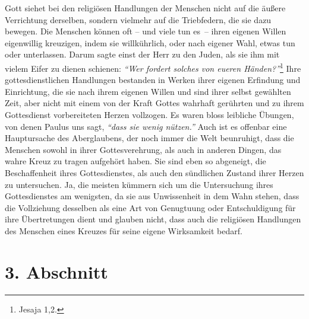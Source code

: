  Gott siehet bei den religiösen
Handlungen der Menschen nicht auf die äußere
Verrichtung derselben, sondern vielmehr auf die Triebfedern, die sie dazu
bewegen.  Die Menschen können oft -- und viele
tun es~-- ihren eigenen Willen
eigenwillig kreuzigen, indem sie willkührlich, oder nach eigener Wahl, etwas
tun oder
unterlassen. Darum sagte einst der Herr zu den Juden, als
sie ihm
mit vielem
Eifer zu dienen schienen:
\textit{"`Wer fordert solches von eueren Händen?"'}\footnote{Jesaja 1,2.}
 Ihre
gottesdienstlichen Handlungen bestanden in Werken ihrer eigenen Erfindung und
Einrichtung, die sie nach ihrem eigenen Willen und sind ihrer selbst gewählten
Zeit, aber nicht mit einem von der Kraft Gottes wahrhaft gerührten und zu ihrem
Gottesdienst vorbereiteten Herzen vollzogen. Es waren bloss leibliche Übungen,
von denen
Paulus uns sagt,
\textit{"`dass sie wenig nützen."'} Auch ist es offenbar eine
Hauptursache des Aberglaubens, der noch
immer die Welt beunruhigt, dass die Menschen sowohl in ihrer Gottesverehrung,
als auch in anderen Dingen, das wahre Kreuz zu tragen aufgehört haben. Sie sind
eben so abgeneigt, die Beschaffenheit ihres Gottesdienstes, als auch den
sündlichen Zustand ihrer Herzen zu untersuchen. Ja,
die meisten kümmern sich um die Untersuchung ihres Gottesdienstes am
wenigsten, da sie aus Unwissenheit in
dem Wahn stehen, dass die Vollziehung desselben als eine Art von Genugtuung
oder Entschuldigung für ihre Übertretungen dient und glauben nicht, dass auch
die religiösen Handlungen des Menschen eines Kreuzes für seine eigene
Wirksamkeit bedarf.

\section{3. Abschnitt} \label{kap6_ab3}

